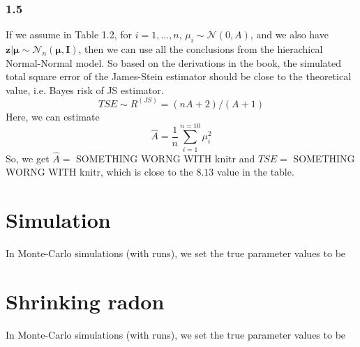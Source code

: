 \documentclass{article}
\newcommand{\rinline}[1]{SOMETHING WORNG WITH knitr}
\begin{document}
\subsubsection*{1.5}
If we assume in Table 1.2, for $i = 1, ..., n$,
$\mu_i \sim \mathcal{N}(0, A)$, and we also have
$\bm{z|\mu} \sim \mathcal{N}_n(\bm{\mu},\bm{I})$, then we can use all the
conclusions from the hierachical Normal-Normal model. \newline
So based on the derivations in the book, the simulated total square
error of the James-Stein estimator should be close to the theoretical 
value, i.e. Bayes risk of JS estimator.
\begin{displaymath}
TSE \sim R^{(JS)} = (nA + 2)/(A+1)
\end{displaymath}
Here, we can estimate
\begin{displaymath}
\hat{A} = \frac{1}{n} \sum_{i=1}^{n=10} \mu_i^2
\end{displaymath}
So, we get $\hat{A}=$ \rinline{A.hat} and $TSE=$ \rinline{TSE}, which is
close to the $8.13$ value in the table.


\newpage
\section*{Simulation}
\hspace{12 pt} In Monte-Carlo simulations (with runs),
we set the true parameter values to be 




\newpage
\section*{Shrinking radon}
\hspace{12 pt} In Monte-Carlo simulations (with runs),
we set the true parameter values to be 
\end{document}
